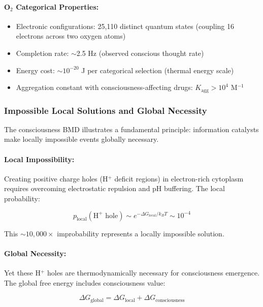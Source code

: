 \paragraph{O\(_2\) Categorical Properties:}
\begin{itemize}
\item Electronic configurations: 25,110 distinct quantum states (coupling 16 electrons across two oxygen atoms)
\item Completion rate: \(\sim\)2.5 Hz (observed conscious thought rate)
\item Energy cost: \(\sim 10^{-20}\) J per categorical selection (thermal energy scale)
\item Aggregation constant with consciousness-affecting drugs: \(K_{\text{agg}} > 10^4\) M\(^{-1}\)
\end{itemize}

\subsubsection{Impossible Local Solutions and Global Necessity}

The consciousness BMD illustrates a fundamental principle: information catalysts make locally impossible events globally necessary.

\paragraph{Local Impossibility:}
Creating positive charge holes (H\(^+\) deficit regions) in electron-rich cytoplasm requires overcoming electrostatic repulsion and pH buffering. The local probability:

\begin{equation}
p_{\text{local}}(\text{H}^+ \text{ hole}) \sim e^{-\Delta G_{\text{local}}/k_B T} \sim 10^{-4}
\end{equation}

This \(\sim 10{,}000\times\) improbability represents a locally impossible solution.

\paragraph{Global Necessity:}
Yet these H\(^+\) holes are thermodynamically necessary for consciousness emergence. The global free energy includes consciousness value:

\begin{equation}
\Delta G_{\text{global}} = \Delta G_{\text{local}} + \Delta G_{\text{consciousness}}
\end{equation}

